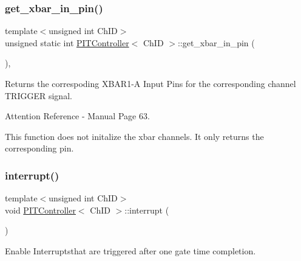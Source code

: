 \subsubsection{\texorpdfstring{get\+\_\+xbar\+\_\+in\+\_\+pin()}{get\_xbar\_in\_pin()}}
{\footnotesize\ttfamily template$<$unsigned int Ch\+ID$>$ \\
unsigned static int \hyperlink{classPITController}{P\+I\+T\+Controller}$<$ Ch\+ID $>$\+::get\+\_\+xbar\+\_\+in\+\_\+pin (\begin{DoxyParamCaption}{ }\end{DoxyParamCaption})\hspace{0.3cm}{\ttfamily [inline]}, {\ttfamily [static]}}



Returns the correspoding X\+B\+A\+R1-\/A Input Pins for the corresponding channel T\+R\+I\+G\+G\+ER signal. 

\begin{DoxyAttention}{Attention}
Reference -\/ Manual Page 63. 

This function does not initalize the xbar channels. It only returns the corresponding pin. 
\end{DoxyAttention}
\mbox{\label{classPITController_af1a21e0b3f9a57e247aa40c457e15ee3}} 
\subsubsection{\texorpdfstring{interrupt()}{interrupt()}}
{\footnotesize\ttfamily template$<$unsigned int Ch\+ID$>$ \\
void \hyperlink{classPITController}{P\+I\+T\+Controller}$<$ Ch\+ID $>$\+::interrupt (\begin{DoxyParamCaption}{ }\end{DoxyParamCaption})\hspace{0.3cm}{\ttfamily [inline]}}



Enable Interruptsthat are triggered after one gate time completion. 

\mbox{\label{classPITController_a6e36c84f319e52e5a14ca20f299b64b5}} 
